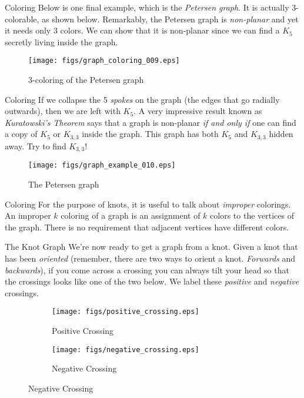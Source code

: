 \documentclass{beamer}
\begin{document}
    \begin{frame}{Coloring}
        Below is one final example, which is the \textit{Petersen graph}.
        It is actually 3-colorable, as shown below. Remarkably, the Petersen
        graph is \textit{non-planar} and yet it needs only 3 colors. We can
        show that it is non-planar since we can find a $K_{5}$ secretly living
        inside the graph.
        \begin{figure}
            \centering
            \texttt{[image: figs/graph\_coloring\_009.eps]}
            \caption{3-coloring of the Petersen graph}
            \label{fig:graph_coloring_009}
        \end{figure}
    \end{frame}
    \begin{frame}{Coloring}
        If we collapse the 5 \textit{spokes} on the graph (the edges that go radially outwards),
        then we are left with $K_{5}$. A very impressive result known as
        \textit{Kuratowski's Theorem} says that a graph is non-planar
        \textit{if and only if} one can find a copy of $K_{5}$ or $K_{3,3}$ inside the graph.
        This graph has both $K_{5}$ and $K_{3,3}$ hidden away. Try to find $K_{3,3}$!
        \begin{figure}
            \centering
            \texttt{[image: figs/graph\_example\_010.eps]}
            \caption{The Petersen graph}
            \label{fig:graph_example_010}
        \end{figure}
    \end{frame}
    \begin{frame}{Coloring}
        For the purpose of knots, it is useful to talk about \textit{improper}
        colorings. An improper $k$ coloring of a graph is an assignment of $k$
        colors to the vertices of the graph. There is no requirement that
        adjacent vertices have different colors.
    \end{frame}
    \begin{frame}{The Knot Graph}
        We're now ready to get a graph from a knot. Given a knot that has
        been \textit{oriented} (remember, there are two ways to orient a knot.
        \textit{Forwards} and \textit{backwards}), if you come across a crossing
        you can always tilt your head so that the crossings looks like one of the
        two below. We label these \textit{positive} and \textit{negative} crossings.
        \begin{figure}
            \centering
            \begin{subfigure}[b]{0.49\textwidth}
                \centering
                \texttt{[image: figs/positive\_crossing.eps]}
                \caption{Positive Crossing}
                \label{fig:positive_crossing}
            \end{subfigure}
            \begin{subfigure}[b]{0.49\textwidth}
                \centering
                \texttt{[image: figs/negative\_crossing.eps]}
                \caption{Negative Crossing}
                \label{fig:negative_crossing}
            \end{subfigure}
        \end{figure}
    \end{frame}
\end{document}
